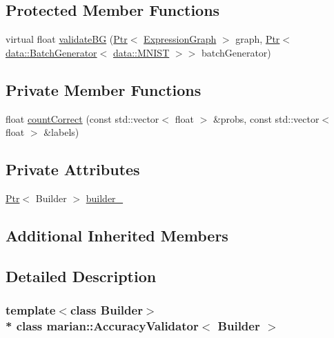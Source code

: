 \subsection*{Protected Member Functions}
\begin{DoxyCompactItemize}
\item 
virtual float \hyperlink{classmarian_1_1AccuracyValidator_a8e46df95f018d71172720c38e8b179b4}{validate\+BG} (\hyperlink{namespacemarian_ad1a373be43a00ef9ce35666145137b08}{Ptr}$<$ \hyperlink{classmarian_1_1ExpressionGraph}{Expression\+Graph} $>$ graph, \hyperlink{namespacemarian_ad1a373be43a00ef9ce35666145137b08}{Ptr}$<$ \hyperlink{classmarian_1_1data_1_1BatchGenerator}{data\+::\+Batch\+Generator}$<$ \hyperlink{classmarian_1_1data_1_1MNIST}{data\+::\+M\+N\+I\+ST} $>$$>$ batch\+Generator)
\end{DoxyCompactItemize}
\subsection*{Private Member Functions}
\begin{DoxyCompactItemize}
\item 
float \hyperlink{classmarian_1_1AccuracyValidator_a8d6ee9daf8781fabfdb72daaaecff191}{count\+Correct} (const std\+::vector$<$ float $>$ \&probs, const std\+::vector$<$ float $>$ \&labels)
\end{DoxyCompactItemize}
\subsection*{Private Attributes}
\begin{DoxyCompactItemize}
\item 
\hyperlink{namespacemarian_ad1a373be43a00ef9ce35666145137b08}{Ptr}$<$ Builder $>$ \hyperlink{classmarian_1_1AccuracyValidator_a59e125240f227510422cb36e315d242c}{builder\+\_\+}
\end{DoxyCompactItemize}
\subsection*{Additional Inherited Members}


\subsection{Detailed Description}
\subsubsection*{template$<$class Builder$>$\\*
class marian\+::\+Accuracy\+Validator$<$ Builder $>$}



